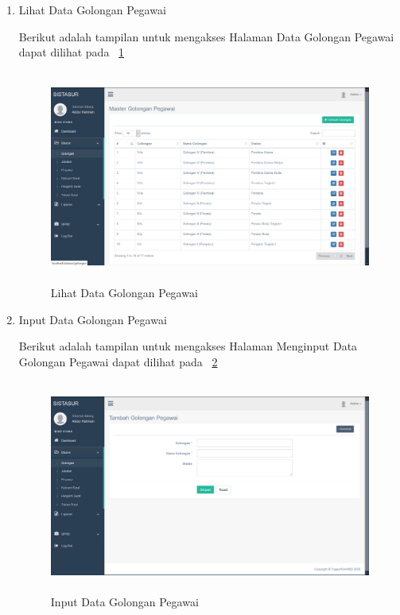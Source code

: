 \begin{enumerate}
\begin{enumerate}
		\item Lihat Data Golongan Pegawai
		
		Berikut adalah tampilan untuk mengakses Halaman Data Golongan Pegawai dapat dilihat pada \pic~\ref{LihatDataGolonganPegawai}
		
		\begin{figure}
			\centering
			\includegraphics [height= 7cm, width=11cm]{konten/gambar/UISistemSurat/Admin/2.LihatDataGolonganPegawai.png}
			\caption{Lihat Data Golongan Pegawai}
			\label{LihatDataGolonganPegawai}
		\end{figure}
		
		\item Input Data Golongan Pegawai
		
		Berikut adalah tampilan untuk mengakses Halaman Menginput Data Golongan Pegawai dapat dilihat pada  \pic~\ref{InputDataGolonganPegawai}
		
		\begin{figure}
			\centering
			\includegraphics [height= 7cm, width=11cm]{konten/gambar/UISistemSurat/Admin/3.InputDataGolonganPegawai.png}
			\caption{Input Data Golongan Pegawai}
			\label{InputDataGolonganPegawai}
		\end{figure}
		

\end{enumerate}
\end{enumerate}
